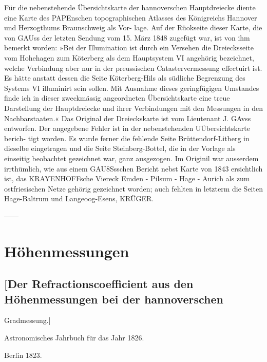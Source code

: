 \documentclass[12pt,a4paper]{article}
\theoremstyle{plain}
\theoremstyle{definition}
\theoremstyle{remark}
\begin{document}
\noindent
Für die nebenstehende Übersichtskarte der hannoverschen Hauptdreiecke diente eine Karte des
PAPEnschen topographischen Atlasses des Königreichs Hannover und Herzogthums Braunschweig als Vor-
lage. Auf der Rüokseite dieser Karte, die von GAUss der letzten Sendung vom 15. März 1848 zugefügt
war, ist von ihm bemerkt worden: »Bei der Illumination ist durch ein Versehen die Dreiecksseite vom
Hohehagen zum Köterberg als dem Hauptsystem VI angehörig bezeichnet, welche Verbindung aber nur in
der preussischen Catastervermessung effectuirt ist. Es hätte anstatt dessen die Seite Köterberg-Hils als
südliche Begrenzung des Systems VI illuminirt sein sollen. Mit Ausnahme dieses geringfügigen Umstandes
finde ich in dieser zweckmässig angeordneten Übersichtskarte eine treue Darstellung der Hauptdreiecke und
ihrer Verbindungen mit den Messungen in den Nachbarstaaten.« Das Original der Dreieckskarte ist vom
Lieutenant J. GAvss entworfen. Der angegebene Fehler ist in der nebenstehenden UÜbersichtskarte berich-
tigt worden. Es wurde ferner die fehlende Seite Brüttendorf-Litberg in dieselbe eingetragen und die Seite
Steinberg-Bottel, die in der Vorlage als einseitig beobachtet gezeichnet war, ganz ausgezogen. Im Originil
war ausserdem irrthümlich, wie aus einem GAU8Ssschen Bericht nebst Karte von 1843 ersichtlich ist, das
KRAYENHOFFsche Viereck Emden - Pilsum - Hage - Aurich als zum ostfriesischen Netze gehörig gezeichnet
worden; auch fehlten in letzterm die Seiten Hage-Baltrum und Langeoog-Esens, KRÜGER.

\noindent
------

\noindent

\noindent

\noindent

\section*{Höhenmessungen}

\noindent

\noindent

\noindent

\subsection*{[Der Refractionscoefficient aus den Höhenmessungen bei der hannoverschen}
Gradmessung.]

\noindent
Astronomisches Jahrbuch für das Jahr 1826.

\noindent
Berlin 1823.
\end{document}
